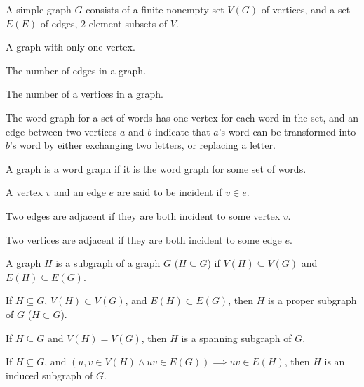 \documentclass{article}
\begin{document}
\pagecolor{black}
\color{white}


    A simple graph $G$ consists of a finite nonempty set $V(G)$ of vertices, and a set $E(E)$ of edges, 2-element subsets of $V$.

\medskip
{}

    A graph with only one vertex.

\medskip
{}

    The number of edges in a graph.

\medskip
{}

    The number of a vertices in a graph.

\medskip
{}

    The word graph for a set of words has one vertex for each word in the set, and an edge between two vertices $a$ and $b$ indicate that $a$'s word can be transformed into $b$'s word by either exchanging two letters, or replacing a letter.

    A graph is a word graph if it is the word graph for some set of words.

\medskip
{}

    A vertex $v$ and an edge $e$ are said to be incident if $v \in e$.

\medskip
{}

    Two edges are adjacent if they are both incident to some vertex $v$.

\medskip
{}

    Two vertices are adjacent if they are both incident to some edge $e$.

\medskip
{}

    A graph $H$ is a subgraph of a graph $G$ ($H \subseteq G$) if $V(H) \subseteq V(G)$ and $E(H) \subseteq E(G)$.

    If $H \subseteq G$, $V(H) \subset V(G)$, and $E(H) \subset E(G)$, then $H$ is a proper subgraph of $G$ ($H \subset G$).

\medskip
{}

    If $H \subseteq G$ and $V(H) = V(G)$, then $H$ is a spanning subgraph of $G$.

\medskip
{}

    If $H \subseteq G$, and $(u,v \in V(H) \wedge uv \in E(G)) \implies uv \in E(H)$, then $H$ is an induced subgraph of $G$.
\end{document}
